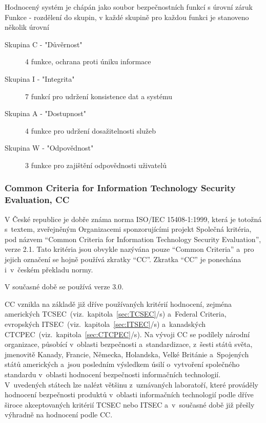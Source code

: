 \documentclass[a4paper,12pt]{article}
\newcommand{\odkazNaKapitolu}[1]{(viz.~kapitola~\ref{#1}/s\pageref{#1})}
\begin{document}
Hodnocený systém je chápán jako soubor bezpečnostních funkcí s úrovní záruk~\cite{PrezentaceBIS}\\

Funkce - rozdělení do skupin, v každé skupině pro každou funkci je stanoveno několik úrovní~\cite{PrezentaceBIS}
\begin{description}
 \item[Skupina C - "Důvěrnost"] 4 funkce, ochrana proti úniku informace 
 \item[Skupina I - "Integrita"] 7 funkcí pro udržení konsistence dat a systému 
 \item[Skupina A - "Dostupnost"] 4 funkce pro udržení dosažitelnosti služeb 
 \item[Skupina W - "Odpovědnost"] 3 funkce pro zajištění odpovědnosti uživatelů 
\end{description}

\subsubsection[Common Criteria, CC]{Common Criteria for Information Technology Security Evaluation, CC}\label{sec:cc}
V České republice je dobře známa norma ISO/IEC 15408-1:1999, která je totožná s~textem, zveřejněným Organizacemi sponzorujícími projekt Společná kritéria, pod názvem “Common Criteria for Information Technology Security Evaluation”, verze 2.1. Tato kritéria jsou obvykle nazývána pouze “Common Criteria” a~pro jejich označení se hojně používá zkratky “CC”. Zkratka “CC”
je ponechána i~v~českém překladu normy.~\cite{NBUHodnoceniBezpecnostiSW}

V současné době se používá verze 3.0.

CC vznikla na základě již dříve používaných kritérií hodnocení, zejména amerických TCSEC~\odkazNaKapitolu{sec:TCSEC} a~Federal Criteria, evropských ITSEC~\odkazNaKapitolu{sec:ITSEC} a~kanadských CTCPEC~\odkazNaKapitolu{sec:CTCPEC}. Na vývoji CC se podílely národní organizace, působící v~oblasti bezpečnosti a~standardizace, z~šesti států světa, jmenovitě Kanady, Francie, Německa, Holandska, Velké Británie a~Spojených států amerických a~jsou posledním výsledkem úsilí o~vytvoření společného standardu v~oblasti hodnocení bezpečnosti informačních technologií. V~uvedených státech lze nalézt většinu z~uznávaných laboratoří, které prováděly hodnocení bezpečnosti produktů v~oblasti informačních technologií podle dříve široce akceptovaných kritérií TCSEC nebo ITSEC a~v~současné době již přešly výhradně na hodnocení podle CC.~\cite{NBUHodnoceniBezpecnostiSW}
\end{document}

